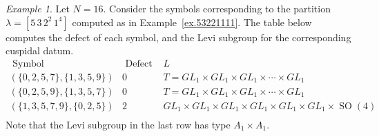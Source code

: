 \documentclass[reqno,11pt]{amsart}
\theoremstyle{remark}
\theoremstyle{remark}
\newtheorem{example}[Thm]{Example}
\theoremstyle{definition}
\theoremstyle{definition}
\theoremstyle{definition}
\numberwithin{equation}{section}
\newcommand{\SO}{\operatorname{SO}}
\begin{document}
\begin{example} Let $N=16$.  Consider the symbols corresponding to the partition $\lambda = [5\,3\,2^2\,1^4]$ computed as in Example~\ref{ex.53221111}. The table below computes the defect of each symbol, and the Levi subgroup for the corresponding cuspidal datum. 
\[
\begin{array}{c|c|c}
\text{ Symbol } & \text{ Defect } & L\\ \hline
(\{0,2,5,7\},\{1,3,5,9\}) & 0 & T = GL_1\times GL_1 \times GL_1\times \cdots \times GL_1  \\
(\{0,2,5,9\},\{1,3,5,7\}) & 0 & T = GL_1\times GL_1 \times GL_1\times \cdots \times GL_1   \\
(\{1,3,5 ,7, 9\},\{0,2,5\}) & 2 & GL_1\times GL_1 \times GL_1\times GL_1 \times GL_1\times GL_1\times \SO(4)   \\
\end{array}
\]
Note that the Levi subgroup in the last row has type $A_1\times A_1$. 
\end{example}
\end{document}
